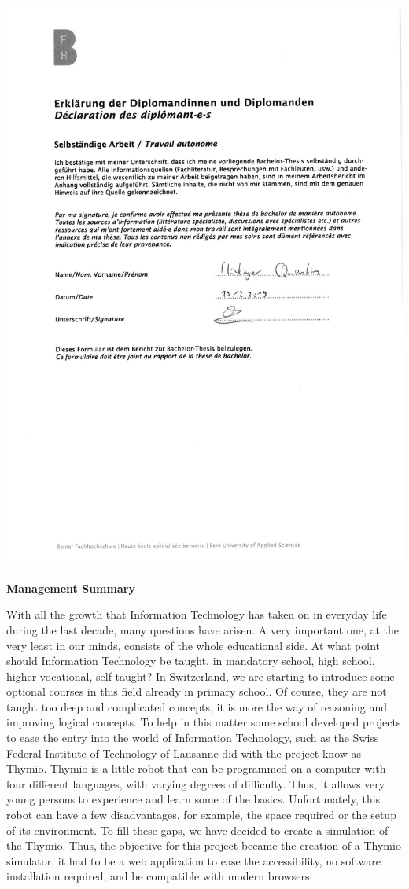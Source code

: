\documentclass{scrbook}
\begin{document}
\includegraphics[width=\textwidth]{pdf/Declaration_of_authonomy.pdf}
\clearpage

\textbf{\large{Management Summary}}

With all the growth that Information Technology has taken on in everyday life during the last decade, many questions have arisen. A very important one, at the very least in our minds, consists of the whole educational side. 
At what point should Information Technology be taught, in mandatory school, high school, higher vocational, self-taught? In Switzerland, we are starting to introduce some optional courses in this field already in primary school. 
Of course, they are not taught too deep and complicated concepts, it is more the way of reasoning and improving logical concepts. To help in this matter some school developed projects to ease the entry into the world of Information Technology, 
such as the Swiss Federal Institute of Technology of Lausanne did with the project know as Thymio. Thymio is a little robot that can be programmed on a computer with four different languages, with varying degrees of difficulty. 
Thus, it allows very young persons to experience and learn some of the basics. Unfortunately, this robot can have a few disadvantages, for example, the space required or the setup of its environment. 
To fill these gaps, we have decided to create a simulation of the Thymio.
Thus, the objective for this project became the creation of a Thymio simulator, it had to be a web application to ease the accessibility, no software installation required, and be compatible with modern browsers.
\end{document}
